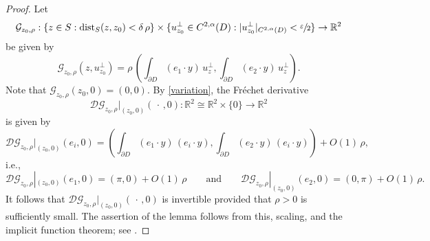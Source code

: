 \documentclass[11pt]{amsart}
\begin{document}
\begin{proof}
 Let 
$$
\mathcal{G}_{z_0,\rho}:\{z\in S:\operatorname{dist}_{S}(z,z_0)<\delta\,\rho\}\times \{u_{z_0}^\perp \in C^{2,\alpha}(D):|u_{z_0}^\perp|_{C^{2,\alpha}(D)}<\sfrac{\varepsilon}{2}\}\to \mathbb{R}^2
$$ 
be given by 
$$
\mathcal{G}_{z_0,\rho}(z,u_{z_0}^\perp)=\rho\,\left(\int_{\partial D}(e_1\cdot y)\,u^\perp_{z},\int_{\partial D}(e_2\cdot y)\,u^\perp_{z}\right).
$$
Note that $\mathcal{G}_{z_0,\rho}(z_0,0)=(0,0)$. By \eqref{variation}, 
 the Fr\'echet derivative
$$
\mathcal{D}\mathcal{G}_{z_0,\rho}|_{(z_0,0)}(\,\cdot\,,0):\mathbb{R}^2\cong\mathbb{R}^2\times \{0\}\to \mathbb{R}^2
$$ 
is given by 
$$
\mathcal{D}\mathcal{G}_{z_0,\rho}|_{(z_0,0)}(e_i,0)=\left(\int_{\partial D}(e_1\cdot y)\,(e_i\cdot y),\int_{\partial D}(e_2\cdot y)\,(e_i\cdot y)\right)+O(1)\,\rho,
$$
i.e., 
$$\mathcal{D}\mathcal{G}_{z_0,\rho}|_{(z_0,0)}(e_1,0)=(\pi,0)+O(1)\,\rho\qquad\text{and}\qquad \mathcal{D}\mathcal{G}_{z_0,\rho}|_{(z_0,0)}(e_2,0)=(0,\pi)+O(1)\,\rho.$$  
It follows that $\mathcal{D}\mathcal{G}_{z_0,\rho}|_{(z_0,0)}(\,\cdot\,,0)$ is invertible provided that $\rho>0$ is sufficiently small. The assertion of the lemma  follows from this, scaling, and the implicit function theorem; see \cite[Theorem 17.6]{GilbargTrudinger}.
\end{proof}
\end{document}
